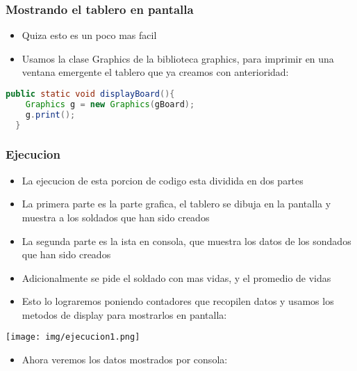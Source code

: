 \subsubsection{Mostrando el tablero en pantalla}
\begin{itemize}
    \item Quiza esto es un poco mas facil
    \item Usamos la clase Graphics de la biblioteca graphics, para imprimir en una ventana emergente el tablero que ya creamos con anterioridad:
\end{itemize}
      \begin{lstlisting}[language=java, caption={Clase Videojuego.java}]
  public static void displayBoard(){
    Graphics g = new Graphics(gBoard);
    g.print();
  }
\end{lstlisting}
\subsubsection{Ejecucion}
\begin{itemize}
    \item La ejecucion de esta porcion de codigo esta dividida en dos partes
    \item La primera parte es la parte grafica, el tablero se dibuja en la pantalla y muestra a los soldados que han sido creados
    \item La segunda parte es la ista en consola, que muestra los datos de los sondados que han sido creados
    \item Adicionalmente se pide el soldado con mas vidas, y el promedio de vidas
    \item Esto lo lograremos poniendo contadores que recopilen datos y usamos los metodos de display para mostrarlos en pantalla:
\end{itemize}
  \centering
  \texttt{[image: img/ejecucion1.png]}
  \begin{itemize}
      \item Ahora veremos los datos mostrados por consola:
      
  \end{itemize}
